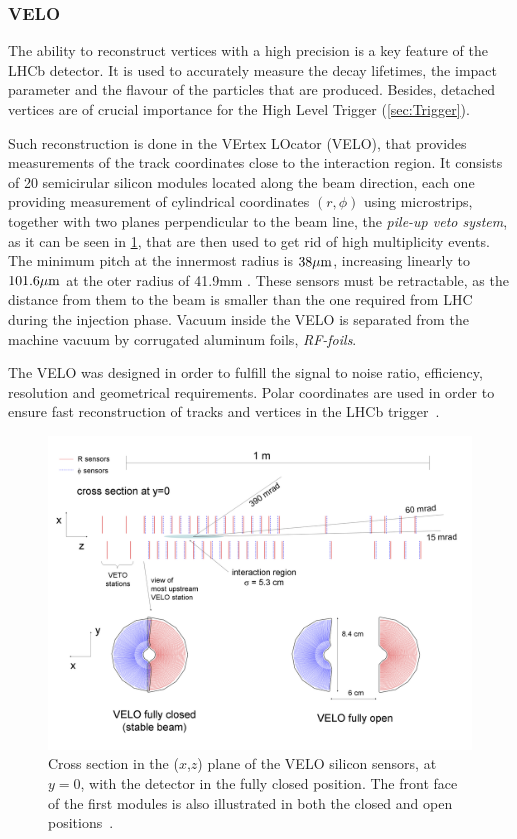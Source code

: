 \subsubsection{VELO} 
The ability to reconstruct vertices with a high precision is a key feature of the LHCb detector. It is  used to accurately measure the decay lifetimes, the impact parameter and the flavour of the particles that are produced. Besides, detached vertices are of crucial importance for the High Level Trigger (\ref{sec:Trigger}). 

Such reconstruction is done in the VErtex LOcator (VELO), that provides measurements of the track coordinates close to the interaction region. It consists of 20 semicirular silicon modules located along the beam direction, each one providing measurement of cylindrical coordinates $(r,\phi)$ using microstrips, together with two planes perpendicular to the beam line, the \textit{pile-up veto system}, as it can be seen in \ref{fig:velo}, that are then used to get rid of high multiplicity events. The minimum pitch at the innermost radius
is $38  \rm \mu m$, increasing linearly to $101.6  \rm \mu m$ at the oter radius of 41.9mm . 
These sensors must be retractable, as the distance from them to the beam is smaller than the one required from LHC during the injection phase.  Vacuum inside the VELO is separated from the machine vacuum by corrugated aluminum foils, \textit{RF-foils}. 

The VELO was designed in order to fulfill the signal to noise ratio, efficiency, resolution and geometrical requirements. Polar coordinates are used in order to ensure fast reconstruction of tracks and vertices in the LHCb trigger~\cite{Alves:2008zz}.

\begin{figure} [htb!]
\begin{center}
\includegraphics[scale=0.18]{figs/velo.png}
\caption{Cross section in the ($x$,$z$) plane of the VELO silicon sensors, at $y=0$, with the detector in the fully closed position. The front face of the first modules is also illustrated in both the closed and open positions~\cite{Alves:2008zz}.\label{fig:velo}}
\end{center}
\end{figure}

